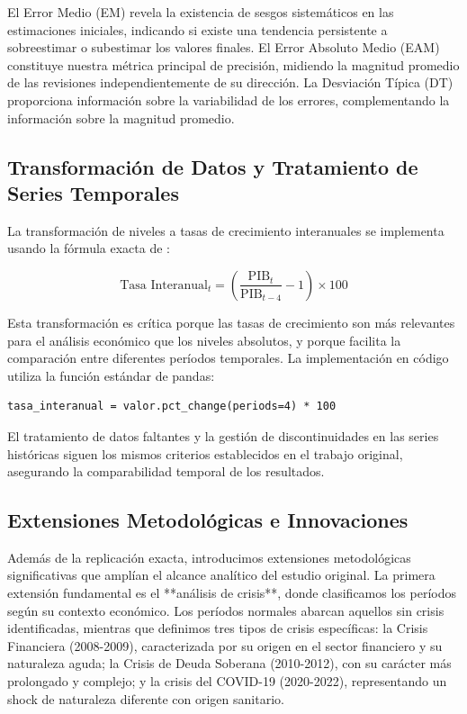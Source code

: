 \documentclass{article}
\begin{document}
El Error Medio (EM) revela la existencia de sesgos sistemáticos en las estimaciones iniciales, indicando si existe una tendencia persistente a sobreestimar o subestimar los valores finales. El Error Absoluto Medio (EAM) constituye nuestra métrica principal de precisión, midiendo la magnitud promedio de las revisiones independientemente de su dirección. La Desviación Típica (DT) proporciona información sobre la variabilidad de los errores, complementando la información sobre la magnitud promedio.

\subsection{Transformación de Datos y Tratamiento de Series Temporales}

La transformación de niveles a tasas de crecimiento interanuales se implementa usando la fórmula exacta de \citet{pavia2017}:

\begin{equation}
\text{Tasa Interanual}_t = \left(\frac{\text{PIB}_t}{\text{PIB}_{t-4}} - 1\right) \times 100
\end{equation}

Esta transformación es crítica porque las tasas de crecimiento son más relevantes para el análisis económico que los niveles absolutos, y porque facilita la comparación entre diferentes períodos temporales. La implementación en código utiliza la función estándar de pandas:

\begin{verbatim}
tasa_interanual = valor.pct_change(periods=4) * 100
\end{verbatim}

El tratamiento de datos faltantes y la gestión de discontinuidades en las series históricas siguen los mismos criterios establecidos en el trabajo original, asegurando la comparabilidad temporal de los resultados.

\subsection{Extensiones Metodológicas e Innovaciones}

Además de la replicación exacta, introducimos extensiones metodológicas significativas que amplían el alcance analítico del estudio original. La primera extensión fundamental es el **análisis de crisis**, donde clasificamos los períodos según su contexto económico. Los períodos normales abarcan aquellos sin crisis identificadas, mientras que definimos tres tipos de crisis específicas: la Crisis Financiera (2008-2009), caracterizada por su origen en el sector financiero y su naturaleza aguda; la Crisis de Deuda Soberana (2010-2012), con su carácter más prolongado y complejo; y la crisis del COVID-19 (2020-2022), representando un shock de naturaleza diferente con origen sanitario.
\end{document}
